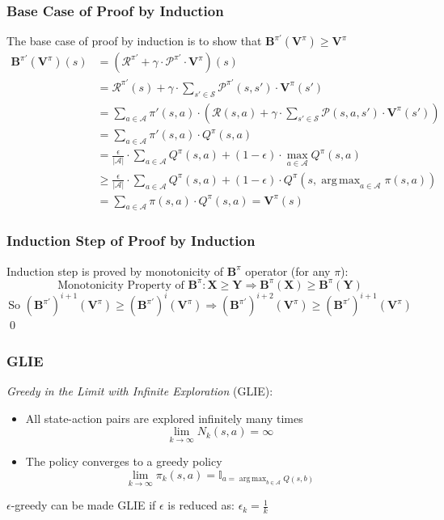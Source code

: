 \documentclass[handout]{beamer}
\DeclareMathOperator*{\argmax}{arg\,max}
\newcommand{\bvpi}{\bm{V}^{\pi}}
\begin{document}
\begin{frame}
\frametitle{Base Case of Proof by Induction}
\pause
The base case of proof by induction is to show that $\bm{B}^{\pi'}(\bvpi)  \geq  \bm{V}^{\pi}$
\pause
\begin{align*}
\bm{B}^{\pi'}(\bvpi)(s) & = (\bm{\mathcal{R}}^{\pi'} + \gamma \cdot \bm{\mathcal{P}}^{\pi'} \cdot \bvpi)(s) \\
& = \bm{\mathcal{R}}^{\pi'}(s) + \gamma \cdot \sum_{s' \in \mathcal{S}} \bm{\mathcal{P}}^{\pi'}(s,s') \cdot \bvpi(s') \\
& = \sum_{a \in \mathcal{A}} \pi'(s, a) \cdot (\mathcal{R}(s,a) + \gamma \cdot \sum_{s' \in \mathcal{S}} \mathcal{P}(s,a,s') \cdot \bvpi(s')) \\
& = \sum_{a \in \mathcal{A}} \pi'(s, a) \cdot Q^{\pi}(s,a) \\
& = \frac {\epsilon} {|\mathcal{A}|} \cdot \sum_{a \in \mathcal{A}} Q^{\pi}(s,a) + (1 - \epsilon) \cdot \max_{a \in \mathcal{A}} Q^{\pi}(s,a) \\
& \geq \frac {\epsilon} {|\mathcal{A}|} \cdot \sum_{a \in \mathcal{A}} Q^{\pi}(s,a) + (1 - \epsilon) \cdot Q^{\pi}(s,\argmax_{a \in \mathcal{A}} \pi(s,a)) \\
& = \sum_{a \in \mathcal{A}} \pi(s,a) \cdot Q^{\pi}(s,a) = \bm{V}^{\pi}(s)
\end{align*}
\end{frame}

\begin{frame}
\frametitle{Induction Step of Proof by Induction}
\pause
Induction step is proved by monotonicity of $\bm{B}^{\pi}$ operator (for any $\pi$):
\pause
$$\text{Monotonicity Property of } \bm{B}^{\pi}: \bm{X} \geq \bm{Y} \Rightarrow \bm{B}^{\pi}(\bm{X}) \geq \bm{B}^{\pi}(\bm{Y})$$
\pause
$$\text{So } (\bm{B}^{\pi'})^{i+1}(\bvpi) \geq (\bm{B}^{\pi'})^i(\bvpi) \Rightarrow (\bm{B}^{\pi'})^{i+2}(\bvpi) \geq (\bm{B}^{\pi'})^{i+1}(\bvpi)$$
\qed
\end{frame}


\begin{frame}
\frametitle{GLIE}
\pause
\begin{definition}
{\em Greedy in the Limit with Infinite Exploration} (GLIE):
\pause
\begin{itemize}[<+->]
\item  All state-action pairs are explored infinitely many times
$$\lim_{k \rightarrow \infty} N_k(s,a) = \infty$$
\item The policy converges to a greedy policy
$$\lim_{k\rightarrow \infty} \pi_k(s,a) = \mathbb{I}_{a = \argmax_{b \in \mathcal{A}} Q(s,b)}$$
\end{itemize}
\end{definition}
\pause
$\epsilon$-greedy can be made GLIE if $\epsilon$ is reduced as: $\epsilon_k = \frac 1 k$
\end{frame}
\end{document}

